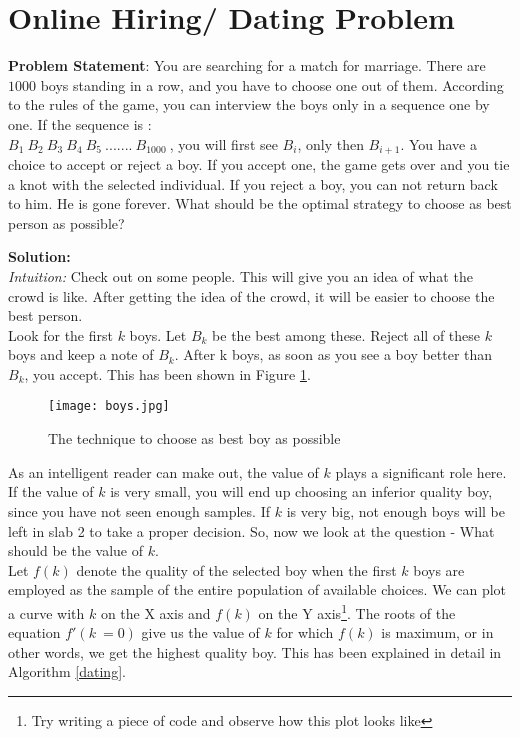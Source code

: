 \documentclass{llncs}
\begin{document}
\section{Online Hiring/ Dating Problem}
\textbf{Problem Statement}: You are searching for a match for marriage. There are $1000$ boys standing in a row, and you have to choose one out of them. According to the rules of the game, you can interview the boys only in a sequence one by one. If the sequence is : \\ $B_1\ B_2\ B_3\ B_4\ B_5\ ....... \ B_{1000}\ $, you will first see $B_i$, only then $B_{i+1}$. You have a choice to accept or reject a boy. If you accept one, the game gets over and you tie a knot with the selected individual. If you reject a boy, you can not return back to him. He is gone forever. What should be the optimal strategy to choose as best person as possible?  

\textbf{Solution:} \\
\textit{Intuition:} Check out on some people. This will give you an idea of what the crowd is like. After getting the idea of the crowd, it will be easier to choose the best person. \\

Look for the first $k$ boys. Let $B_k$ be the best among these. Reject all of these $k$ boys and keep a note of $B_k$. After k boys, as soon as you see a boy better than $B_k$, you accept. This has been shown in Figure \ref{boy}.

\begin{figure}[h]
\centering
\texttt{[image: boys.jpg]}
\label{boy}
\caption{The technique to choose as best boy as possible}
\end{figure}

As an intelligent reader can make out, the value of $k$ plays a significant role here. If the value of $k$ is very small, you will end up choosing an inferior quality boy, since you have not seen enough samples. If $k$ is very big, not enough boys will be left in slab 2 to take a proper decision. So, now we look at the question - What should be the value of $k$.\\

Let $f(k)$ denote the quality of the selected boy when the first $k$ boys are employed as the sample of the entire population of available choices. We can plot a curve with $k$ on the X axis and $f(k)$ on the Y axis\footnote{Try writing a piece of code and observe how this plot looks like}. The roots of the equation $f'(k\ =0)$ give us the value of $k$ for which $f(k)$ is maximum, or in other words, we get the highest quality boy. This has been explained in detail in Algorithm \ref{dating}.
\end{document}
